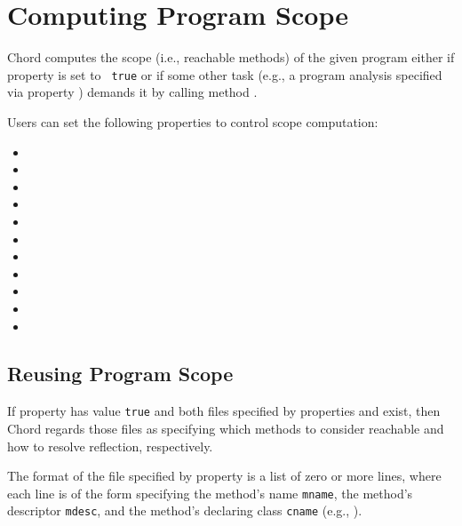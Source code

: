 \section{Computing Program Scope}
\label{sec:building-scope}

Chord computes the scope (i.e., reachable methods) of the given
program either if property  is set to {\tt
  true} or if some other task (e.g., a program analysis specified via
property ) demands it by calling method
.

Users can set the following properties to control scope computation:

\begin{itemize}
\item {}
\item {}
\item {}
\item {}
\item {}
\item {}
\item {}
\item {}
\item {}
\item {}
\item {}
\end{itemize}

\subsection{Reusing Program Scope}

If property  has value {\tt true} and both
files specified by properties  and
 exist, then Chord regards those files as
specifying which methods to consider reachable and how to resolve
reflection, respectively.

The format of the file specified by property 
is a list of zero or more lines, where each line is of the form
specifying the method's name {\tt mname}, the method's descriptor
{\tt mdesc}, and the method's declaring class {\tt cname} (e.g.,
\code{main:([Ljava/lang/String;)V@foo.bar.Main}).

